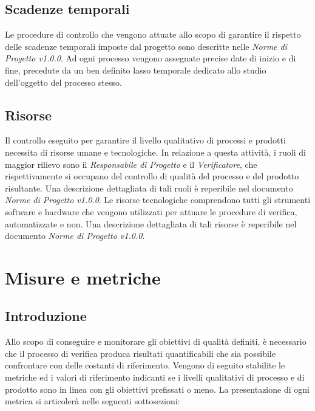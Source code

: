 \documentclass[openany,12pt,a4paper]{report}
\begin{document}
    \section{Scadenze temporali}
    
    Le procedure di controllo che vengono attuate allo scopo di garantire il rispetto delle scadenze temporali imposte dal progetto sono descritte nelle \textit{Norme di Progetto v1.0.0}. Ad ogni processo vengono assegnate precise date di inizio e di fine, precedute da un ben definito lasso temporale dedicato allo studio dell'oggetto del processo stesso.
    
    \section{Risorse}
    
    Il controllo eseguito per garantire il livello qualitativo di processi e prodotti necessita di risorse umane e tecnologiche. In relazione a questa attività, i ruoli di maggior rilievo sono il \textit{Responsabile di Progetto} e il \textit{Verificatore}, che rispettivamente si occupano del controllo di qualità del processo e del prodotto risultante. Una descrizione dettagliata di tali ruoli è reperibile nel documento \textit{Norme di Progetto v1.0.0}. 
    Le risorse tecnologiche comprendono tutti gli strumenti software e hardware che vengono utilizzati per attuare le procedure di verifica, automatizzate e non. Una descrizione dettagliata di tali risorse è reperibile nel documento \textit{Norme di Progetto v1.0.0}. 



\chapter{Misure e metriche}

\section{Introduzione}

Allo scopo di conseguire e monitorare gli obiettivi di qualità definiti, è necessario che il processo di verifica produca risultati quantificabili che sia possibile confrontare con delle costanti di riferimento. Vengono di seguito stabilite le metriche ed i valori di riferimento indicanti se i livelli qualitativi di processo e di prodotto sono in linea con gli obiettivi prefissati o meno. La presentazione di ogni metrica si articolerà nelle seguenti sottosezioni:
\end{document}
